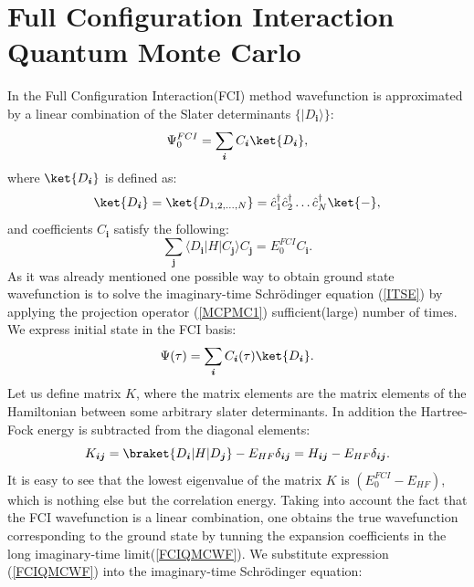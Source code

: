 \documentclass[twoside,english]{uiofysmaster}
\begin{document}
\section{Full Configuration Interaction Quantum Monte Carlo}

In the Full Configuration Interaction(FCI) method wavefunction is approximated by a linear combination of the Slater determinants $\{|D_{\boldsymbol{i}}\rangle\}$:
\begin{equation}
\Psi_0^{FCI} = \sum_{\boldsymbol{i}}C_{\boldsymbol{i}}\ket{D_{\boldsymbol{i}}},
\end{equation}
where $\ket{D_{\boldsymbol{i}}}$ is defined as:
\begin{equation}
\ket{D_{\boldsymbol{i}}} = \ket{D_{1,2, \dots ,N}} = \hat{c}_1^\dagger \hat{c}_2^\dagger \dots \hat{c}_N^\dagger \ket{-}, 
\end{equation}
and coefficients $C_{\boldsymbol{i}}$ satisfy the following:
\begin{equation}
\sum_{\boldsymbol{j}} \langle D_{\boldsymbol{i}}|H|C_{\boldsymbol{j}} \rangle C_{\boldsymbol{j}}=E_0^{FCI}C_{\boldsymbol{i}}.
\end{equation}
As it was already mentioned one possible way to obtain ground state wavefunction is to solve the imaginary-time Schr\"{o}dinger equation (\ref{ITSE}) by applying the projection operator (\ref{MCPMC1}) sufficient(large) number of times. We express initial state in the FCI basis:
\begin{equation}\label{FCIQMCWF}
\Psi(\tau) = \sum_{\boldsymbol{i}}C_{\boldsymbol{i}}(\tau)\ket{D_{\boldsymbol{i}}}.
\end{equation}
Let us define matrix $K$, where the matrix elements are the matrix elements of the Hamiltonian between some arbitrary slater determinants. In addition the Hartree-Fock energy is subtracted from the diagonal elements:
\begin{equation}
K_{\boldsymbol{ij}} = \braket{D_{\boldsymbol{i}}|H|D_{\boldsymbol{j}}}-E_{HF}\delta_{\boldsymbol{ij}} = H_{\boldsymbol{ij}}-E_{HF}\delta_{\boldsymbol{ij}}.
\end{equation}
It is easy to see that the lowest eigenvalue of the matrix $K$ is
$(E_0^{FCI}-E_{HF})$, which is nothing else but the correlation
energy. Taking into account the fact that the FCI wavefunction is a
linear combination, one obtains the true wavefunction corresponding to
the ground state by tunning the expansion coefficients in the long
imaginary-time limit(\ref{FCIQMCWF}).  We substitute expression
(\ref{FCIQMCWF}) into the imaginary-time Schr\"{o}dinger equation:
\end{document}
